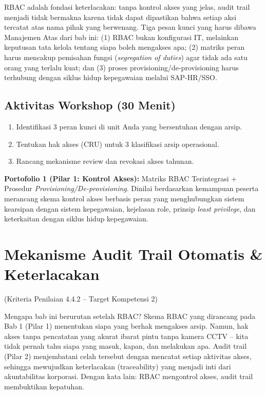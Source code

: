 \documentclass[12pt,a4paper]{report}
\begin{document}
\begin{plnbox}
RBAC adalah fondasi keterlacakan: tanpa kontrol akses yang jelas, audit trail menjadi tidak bermakna karena tidak dapat dipastikan bahwa setiap aksi tercatat atas nama pihak yang berwenang. Tiga pesan kunci yang harus dibawa Manajemen Atas dari bab ini: (1) RBAC bukan konfigurasi IT, melainkan keputusan tata kelola tentang siapa boleh mengakses apa; (2) matriks peran harus mencakup pemisahan fungsi (\textit{segregation of duties}) agar tidak ada satu orang yang terlalu kuat; dan (3) proses provisioning/de-provisioning harus terhubung dengan siklus hidup kepegawaian melalui SAP-HR/SSO.
\end{plnbox}

\section{Aktivitas Workshop (30 Menit)}
\begin{enumerate}[leftmargin=*]
    \item Identifikasi 3 peran kunci di unit Anda yang bersentuhan dengan arsip.
    \item Tentukan hak akses (CRU) untuk 3 klasifikasi arsip operasional.
    \item Rancang mekanisme review dan revokasi akses tahunan.
\end{enumerate}

\begin{outputbox}
\textbf{Portofolio 1 (Pilar 1: Kontrol Akses):} Matriks RBAC Terintegrasi + Prosedur \textit{Provisioning/De-provisioning}. Dinilai berdasarkan kemampuan peserta merancang skema kontrol akses berbasis peran yang menghubungkan sistem kearsipan dengan sistem kepegawaian, kejelasan role, prinsip \textit{least privilege}, dan keterkaitan dengan siklus hidup kepegawaian.
\end{outputbox}

\chapter{Mekanisme Audit Trail Otomatis \& Keterlacakan}
(Kriteria Penilaian 4.4.2 -- Target Kompetensi 2)

Mengapa bab ini berurutan setelah RBAC? Skema RBAC yang dirancang pada Bab 1 (Pilar 1) menentukan siapa yang berhak mengakses arsip. Namun, hak akses tanpa pencatatan yang akurat ibarat pintu tanpa kamera CCTV -- kita tidak pernah tahu siapa yang masuk, kapan, dan melakukan apa. Audit trail (Pilar 2) menjembatani celah tersebut dengan mencatat setiap aktivitas akses, sehingga mewujudkan keterlacakan (traceability) yang menjadi inti dari akuntabilitas korporasi. Dengan kata lain: RBAC mengontrol akses, audit trail membuktikan kepatuhan.
\end{document}

